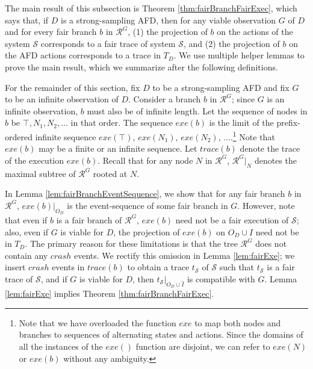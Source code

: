 \documentclass[11pt]{article}
\numberwithin{theorem}{section}
\begin{document}
The main result of this subsection is Theorem \ref{thm:fairBranchFairExec}, which says that, if $D$ is a strong-sampling AFD, then for any viable observation $G$ of $D$ and for every fair branch $b$ in $\mathcal{R}^G$, (1) the projection of $b$ on the actions of the system $\mathcal{S}$ corresponds to a fair trace of system $\mathcal{S}$, and (2) the projection of $b$ on the AFD actions corresponds to a trace in $T_D$.
We use  multiple helper lemmas to prove the main result, which we summarize after the following definitions.


 For the remainder of this section, fix $D$ to be a strong-sampling AFD and fix $G$ to be an infinite observation of $D$. 
 Consider a branch $b$ in $\mathcal{R}^{G}$; since $G$ is an infinite observation, $b$ must also be of infinite length. Let the sequence of nodes in
$b$ be $\top,N_1,N_2,\ldots$ in that order. The sequence $exe(b)$ is
the limit of the prefix-ordered infinite sequence $exe(\top)$,
$exe(N_1)$, $exe(N_2)$, $\ldots$.\footnote{Note that we have 
  overloaded the function $exe$ to map both nodes and branches to sequences 
  of alternating states and actions. Since the domains of all the instances
  of the $exe()$ function are disjoint, we can refer to $exe(N)$ or $exe(b)$   
  without any ambiguity.} Note that $exe(b)$ may be a finite
or an infinite sequence.
Let $trace(b)$ denote the trace of the execution $exe(b)$.
Recall that for any node $N$ in $\mathcal{R}^G$,  $\mathcal{R}^G|_N$ denotes the maximal subtree of $\mathcal{R}^G$ rooted at $N$.
  
In Lemma \ref{lem:fairBranchEventSequence}, we show that for any fair branch $b$ in $\mathcal{R}^G$, $exe(b)|_{O_D}$ is the event-sequence of some fair branch in $G$. 
However, note that even if $b$ is a fair branch of $\mathcal{R}^G$, $exe(b)$ need not be a fair execution of $\mathcal{S}$; also, even if $G$ is viable for $D$, the projection of $exe(b)$ on $O_D \cup \hat{I}$ need not be in $T_D$. The primary reason for these limitations is that the tree $\mathcal{R}^G$ does not contain any $crash$ events. We rectify this omission  in Lemma \ref{lem:fairExe}; we insert $crash$ events in $trace(b)$ to obtain a trace $t_{\mathcal{S}}$ of $\mathcal{S}$ such that $t_{\mathcal{S}}$ is a fair trace of $\mathcal{S}$, and if $G$ is viable for $D$, then $t_{\mathcal{S}}|_{O_D \cup \hat{I}}$ is compatible with $G$.
Lemma \ref{lem:fairExe} implies Theorem \ref{thm:fairBranchFairExec}.
\end{document}

